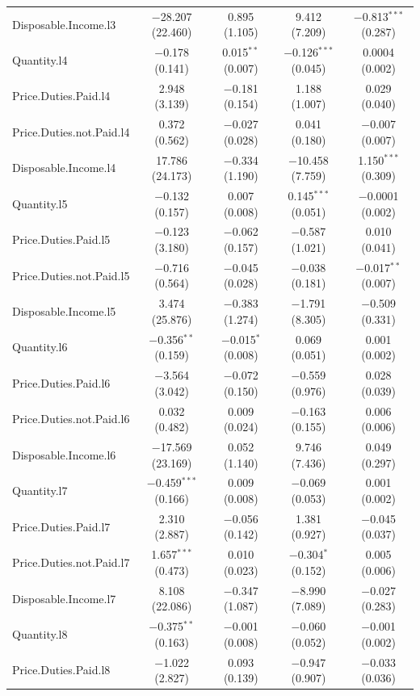 \documentclass[11pt,preprint, authoryear]{elsarticle}
\let\origtable\table
\let\endorigtable\endtable
\renewenvironment{table}[1][2] {
    \expandafter\origtable\expandafter[H]
} {
    \endorigtable
}
\numberwithin{equation}{section}
\numberwithin{figure}{section}
\numberwithin{table}{section}
\begin{document}
\begin{table}[!htbp]
\begin{tabular}{@{\extracolsep{1pt}}lcccc}
  Disposable.Income.l3 & $-$28.207 (22.460) & 0.895 (1.105) & 9.412 (7.209) & $-$0.813$^{***}$ (0.287) \\ 
  Quantity.l4 & $-$0.178 (0.141) & 0.015$^{**}$ (0.007) & $-$0.126$^{***}$ (0.045) & 0.0004 (0.002) \\ 
  Price.Duties.Paid.l4 & 2.948 (3.139) & $-$0.181 (0.154) & 1.188 (1.007) & 0.029 (0.040) \\ 
  Price.Duties.not.Paid.l4 & 0.372 (0.562) & $-$0.027 (0.028) & 0.041 (0.180) & $-$0.007 (0.007) \\ 
  Disposable.Income.l4 & 17.786 (24.173) & $-$0.334 (1.190) & $-$10.458 (7.759) & 1.150$^{***}$ (0.309) \\ 
  Quantity.l5 & $-$0.132 (0.157) & 0.007 (0.008) & 0.145$^{***}$ (0.051) & $-$0.0001 (0.002) \\ 
  Price.Duties.Paid.l5 & $-$0.123 (3.180) & $-$0.062 (0.157) & $-$0.587 (1.021) & 0.010 (0.041) \\ 
  Price.Duties.not.Paid.l5 & $-$0.716 (0.564) & $-$0.045 (0.028) & $-$0.038 (0.181) & $-$0.017$^{**}$ (0.007) \\ 
  Disposable.Income.l5 & 3.474 (25.876) & $-$0.383 (1.274) & $-$1.791 (8.305) & $-$0.509 (0.331) \\ 
  Quantity.l6 & $-$0.356$^{**}$ (0.159) & $-$0.015$^{*}$ (0.008) & 0.069 (0.051) & 0.001 (0.002) \\ 
  Price.Duties.Paid.l6 & $-$3.564 (3.042) & $-$0.072 (0.150) & $-$0.559 (0.976) & 0.028 (0.039) \\ 
  Price.Duties.not.Paid.l6 & 0.032 (0.482) & 0.009 (0.024) & $-$0.163 (0.155) & 0.006 (0.006) \\ 
  Disposable.Income.l6 & $-$17.569 (23.169) & 0.052 (1.140) & 9.746 (7.436) & 0.049 (0.297) \\ 
  Quantity.l7 & $-$0.459$^{***}$ (0.166) & 0.009 (0.008) & $-$0.069 (0.053) & 0.001 (0.002) \\ 
  Price.Duties.Paid.l7 & 2.310 (2.887) & $-$0.056 (0.142) & 1.381 (0.927) & $-$0.045 (0.037) \\ 
  Price.Duties.not.Paid.l7 & 1.657$^{***}$ (0.473) & 0.010 (0.023) & $-$0.304$^{*}$ (0.152) & 0.005 (0.006) \\ 
  Disposable.Income.l7 & 8.108 (22.086) & $-$0.347 (1.087) & $-$8.990 (7.089) & $-$0.027 (0.283) \\ 
  Quantity.l8 & $-$0.375$^{**}$ (0.163) & $-$0.001 (0.008) & $-$0.060 (0.052) & $-$0.001 (0.002) \\ 
  Price.Duties.Paid.l8 & $-$1.022 (2.827) & 0.093 (0.139) & $-$0.947 (0.907) & $-$0.033 (0.036) \\ 

\end{tabular}
\end{table}
\end{document}
